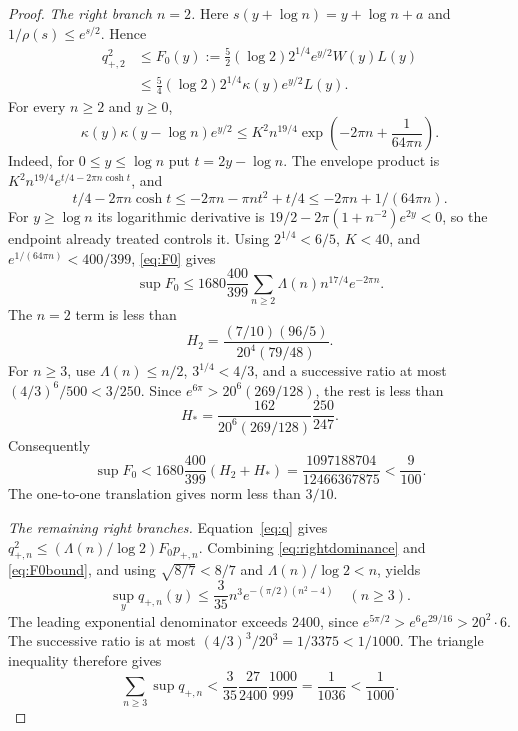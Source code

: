 \documentclass[11pt]{article}
\theoremstyle{remark}\newtheorem{remark}[theorem]{Remark}
\numberwithin{equation}{section}
\begin{document}
\begin{proof}
\textit{The right branch $n=2$.}
Here $s(y+\log n)=y+\log n+a$ and $1/\rho(s)\le e^{s/2}$. Hence
\begin{align}
 q_{+,2}^2&\le F_0(y):=\tfrac52(\log2)2^{1/4}e^{y/2}W(y)L(y)\nonumber\\
 &\le\tfrac54(\log2)2^{1/4}\kappa(y)e^{y/2}L(y).\label{eq:F0}
\end{align}
For every $n\ge2$ and $y\ge0$,
\begin{equation}\label{eq:product}
 \kappa(y)\kappa(y-\log n)e^{y/2}
 \le K^2 n^{19/4}\exp\left(-2\pi n+\frac1{64\pi n}\right).
\end{equation}
Indeed, for $0\le y\le\log n$ put $t=2y-\log n$. The envelope product is
$K^2n^{19/4}e^{t/4-2\pi n\cosh t}$, and
\[
 t/4-2\pi n\cosh t\le-2\pi n-\pi nt^2+t/4
                       \le-2\pi n+1/(64\pi n).
\]
For $y\ge\log n$ its logarithmic derivative is
$19/2-2\pi(1+n^{-2})e^{2y}<0$, so the endpoint already treated controls it.
Using $2^{1/4}<6/5$, $K<40$, and
$e^{1/(64\pi n)}<400/399$, \eqref{eq:F0} gives
\[
 \sup F_0\le1680\frac{400}{399}
                  \sum_{n\ge2}\Lambda(n)n^{17/4}e^{-2\pi n}.
\]
The $n=2$ term is less than
\[
 H_2=\frac{(7/10)(96/5)}{20^4(79/48)}.
\]
For $n\ge3$, use $\Lambda(n)\le n/2$, $3^{1/4}<4/3$, and a successive ratio at most
$(4/3)^6/500<3/250$. Since $e^{6\pi}>20^6(269/128)$, the rest is less than
\[
 H_* =\frac{162}{20^6(269/128)}\frac{250}{247}.
\]
Consequently
\begin{equation}\label{eq:F0bound}
 \sup F_0<1680\frac{400}{399}(H_2+H_*)
       =\frac{1097188704}{12466367875}<\frac9{100}.
\end{equation}
The one-to-one translation gives norm less than $3/10$.

\medskip\noindent
\textit{The remaining right branches.}
Equation~\eqref{eq:q} gives
$q_{+,n}^2\le(\Lambda(n)/\log2)F_0p_{+,n}$.
Combining \eqref{eq:rightdominance} and \eqref{eq:F0bound}, and using
$\sqrt{8/7}<8/7$ and $\Lambda(n)/\log2<n$, yields
\[
 \sup_y q_{+,n}(y)\le\frac3{35}n^3e^{-(\pi/2)(n^2-4)}\quad(n\ge3).
\]
The leading exponential denominator exceeds $2400$, since
$e^{5\pi/2}>e^6e^{29/16}>20^2\cdot6$.
The successive ratio is at most $(4/3)^3/20^3=1/3375<1/1000$.
The triangle inequality therefore gives
\begin{equation}\label{eq:rightrest}
 \sum_{n\ge3}\sup q_{+,n}
 <\frac3{35}\frac{27}{2400}\frac{1000}{999}
 =\frac1{1036}<\frac1{1000}.
\end{equation}


\end{proof}
\end{document}
